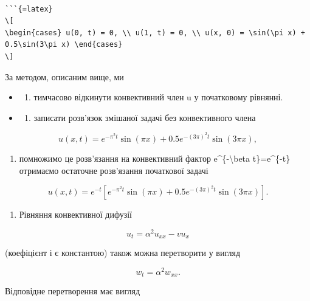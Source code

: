 \documentclass[
]{article}
\providecommand{\tightlist}{%
  \setlength{\itemsep}{0pt}\setlength{\parskip}{0pt}}
\begin{document}
\begin{verbatim}

```{=latex}
\[
\begin{cases} u(0, t) = 0, \\ u(1, t) = 0, \\ u(x, 0) = \sin(\pi x) + 0.5\sin(3\pi x) \end{cases}
\]
\end{verbatim}

За методом, описаним вище, ми

\begin{itemize}
\tightlist
\item
  \begin{enumerate}
  \def\labelenumi{\alph{enumi})}
  \tightlist
  \item
    тимчасово відкинути конвективний член u у початковому рівнянні.
  \end{enumerate}
\item
  \begin{enumerate}
  \def\labelenumi{\alph{enumi})}
  \setcounter{enumi}{1}
  \tightlist
  \item
    записати розв'язок змішаної задачі без конвективного члена
  \end{enumerate}
\end{itemize}

\[
u(x, t) = e^{-\pi^2 t} \sin(\pi x) + 0.5e^{-(3\pi)^2 t} \sin(3\pi x),
\]

\begin{enumerate}
\def\labelenumi{\alph{enumi})}
\setcounter{enumi}{2}
\tightlist
\item
  помножимо це розв'язання на конвективний фактор
  e\^{}\{-\textbackslash beta t\}=e\^{}\{-t\} отримаємо остаточне
  розв'язання початкової задачі
\end{enumerate}

\[
u(x, t) = e^{-t} \left[ e^{-\pi^2 t} \sin(\pi x) + 0.5e^{-(3\pi)^2 t} \sin(3\pi x) \right].
\]

\begin{enumerate}
\def\labelenumi{\arabic{enumi}.}
\setcounter{enumi}{1}
\tightlist
\item
  Рівняння конвективної дифузії
\end{enumerate}

\[
u_t = \alpha^2 u_{xx} - v u_x
\]

(коефіцієнт і є константою) також можна перетворити у вигляд

\[
w_t = \alpha^2 w_{xx}.
\]

Відповідне перетворення має вигляд
\end{document}

